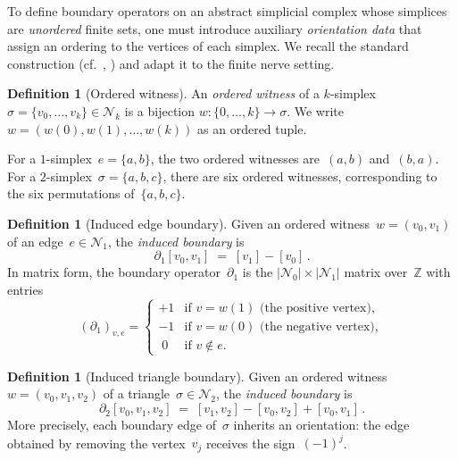 \documentclass[11pt,a4paper]{article}
\theoremstyle{plain}
\theoremstyle{definition}
\newtheorem{definition}[theorem]{Definition}
\theoremstyle{remark}
\newcommand{\ZZ}{\mathbb{Z}}
\newcommand{\cN}{\mathcal{N}}
\begin{document}
To define boundary operators on an abstract simplicial complex whose
simplices are \emph{unordered} finite sets, one must introduce auxiliary
\emph{orientation data} that assign an ordering to the vertices of each
simplex. We recall the standard construction (cf.~\cite[Chapter~2]{Hatcher:2002},
\cite[Chapter~1]{Munkres:1984}) and adapt it to the finite nerve setting.

\begin{definition}[Ordered witness]
\label{def:witness}
An \emph{ordered witness} of a $k$-simplex~$\sigma = \{v_0, \ldots, v_k\}
\in \cN_k$ is a bijection $w \colon \{0, \ldots, k\} \to \sigma$.
We write~$w = (w(0), w(1), \ldots, w(k))$ as an ordered tuple.
\end{definition}

For a $1$-simplex~$e = \{a,b\}$, the two ordered witnesses are~$(a,b)$
and~$(b,a)$. For a $2$-simplex~$\sigma = \{a,b,c\}$, there are six
ordered witnesses, corresponding to the six permutations of~$\{a,b,c\}$.

\begin{definition}[Induced edge boundary]
\label{def:edge-boundary}
Given an ordered witness~$w = (v_0, v_1)$ of an edge~$e \in \cN_1$,
the \emph{induced boundary} is
\begin{equation}
  \label{eq:edge-boundary}
  \partial_1 [v_0, v_1] \;=\; [v_1] - [v_0]\,.
\end{equation}
In matrix form, the boundary operator~$\partial_1$ is the
$|\cN_0| \times |\cN_1|$ matrix over~$\ZZ$ with entries
\[
  (\partial_1)_{v,e} =
  \begin{cases}
    +1 & \text{if } v = w(1) \text{ (the positive vertex)}, \\
    -1 & \text{if } v = w(0) \text{ (the negative vertex)}, \\
    \;0 & \text{if } v \notin e.
  \end{cases}
\]
\end{definition}

\begin{definition}[Induced triangle boundary]
\label{def:triangle-boundary}
Given an ordered witness~$w = (v_0, v_1, v_2)$ of a triangle~$\sigma
\in \cN_2$, the \emph{induced boundary} is
\begin{equation}
  \label{eq:triangle-boundary}
  \partial_2 [v_0, v_1, v_2] \;=\; [v_1, v_2] - [v_0, v_2] + [v_0, v_1]\,.
\end{equation}
More precisely, each boundary edge of~$\sigma$ inherits an orientation:
the edge obtained by removing the vertex~$v_j$ receives the sign~$(-1)^j$.
\end{definition}
\end{document}
